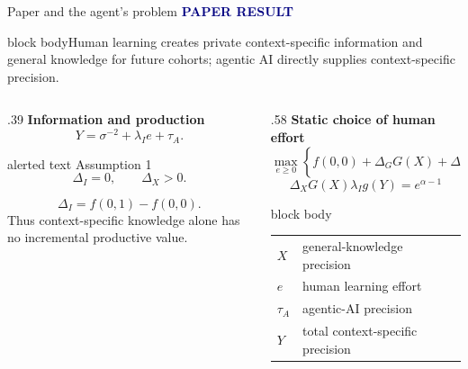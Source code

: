 \documentclass[aspectratio=169,10pt]{beamer}
\newcommand{\paperlabel}{\textcolor{Navy}{\scriptsize\bfseries PAPER RESULT}}
\newcommand{\softbox}[1]{\begin{beamercolorbox}[rounded=true,sep=.6em]{block body}#1\end{beamercolorbox}}
\begin{document}
\begin{frame}{Paper and the agent's problem}
  \paperlabel
  \vspace{.12cm}

  \softbox{\small Human learning creates private context-specific information and general
  knowledge for future cohorts; agentic AI directly supplies context-specific precision.}

  \vspace{.25cm}
  \begin{columns}[T,onlytextwidth]
    \begin{column}{.39\textwidth}
      \textbf{Information and production}
      \[
        Y=\sigma^{-2}+\lambda_I e+\tau_A.
      \]
      \begin{beamercolorbox}[rounded=true,sep=.55em]{alerted text}
        \centering Assumption 1
        \[
          \Delta_I=0,\qquad \Delta_X>0.
        \]
      \end{beamercolorbox}
      \vspace{.12cm}
      \scriptsize
      \[
        \Delta_I=f(0,1)-f(0,0).
      \]
      Thus context-specific knowledge alone has no incremental productive value.
    \end{column}

    \begin{column}{.58\textwidth}
      \textbf{Static choice of human effort}
      \[
      \max_{e\ge 0}\left\{
      f(0,0)+\Delta_GG(X)+\Delta_XG(X)G(Y)
      -\frac{e^\alpha}{\alpha}\right\}.
      \]
      \vspace{-.2cm}
      \[
        \boxed{\Delta_XG(X)\lambda_I g(Y)=e^{\alpha-1}}
      \]
      \vspace{-.05cm}
      \begin{beamercolorbox}[rounded=true,sep=.5em]{block body}
      \scriptsize
      \begin{tabular}{@{}ll@{}}
        $X$ & general-knowledge precision \\
        $e$ & human learning effort \\
        $\tau_A$ & agentic-AI precision \\
        $Y$ & total context-specific precision
      \end{tabular}
      \end{beamercolorbox}
    \end{column}
  \end{columns}
\end{frame}
\end{document}
